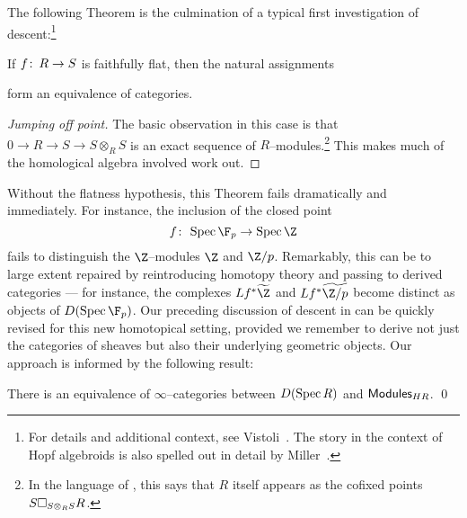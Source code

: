 The following Theorem is the culmination of a typical first investigation of descent:\footnote{For details and additional context, see Vistoli~\cite[Section 4.2.1]{Vistoli}.  The story in the context of Hopf algebroids is also spelled out in detail by Miller~\cite{MillerSheavesGradings}.}

\begin{theorem}[Grothendieck]\label{OriginalFFDescent}
If $f\colon\thinspace R \to S$ is faithfully flat, then the natural assignments
\begin{center}
\end{center}
form an equivalence of categories.
\end{theorem}
\begin{proof}[Jumping off point]
The basic observation in this case is that $0 \to R \to S \to S \otimes_R S$ is an exact sequence of $R$--modules.\footnote{In the language of , this says that $R$ itself appears as the cofixed points $S \square_{S \otimes_R S} R$.}  This makes much of the homological algebra involved work out.
\end{proof}

Without the flatness hypothesis, this Theorem fails dramatically and immediately.  For instance, the inclusion of the closed point \[f\co \Spec \F_p \to \Spec \Z\] fails to distinguish the $\Z$--modules $\Z$ and $\Z/p$.  Remarkably, this can be to large extent repaired by reintroducing homotopy theory and passing to derived categories --- for instance, the complexes $Lf^* \widetilde{\Z}$ and $Lf^* \widetilde{\Z/p}$ become distinct as objects of $D(\Spec \F_p)$.  Our preceding discussion of descent in  can be quickly revised for this new homotopical setting, provided we remember to derive not just the categories of sheaves but also their underlying geometric objects.  Our approach is informed by the following result:

\begin{lemma}
There is an equivalence of $\infty$--categories between $D(\operatorname{Spec} R)$ and $\mathsf{Modules}_{HR}$. \qed
\end{lemma}

